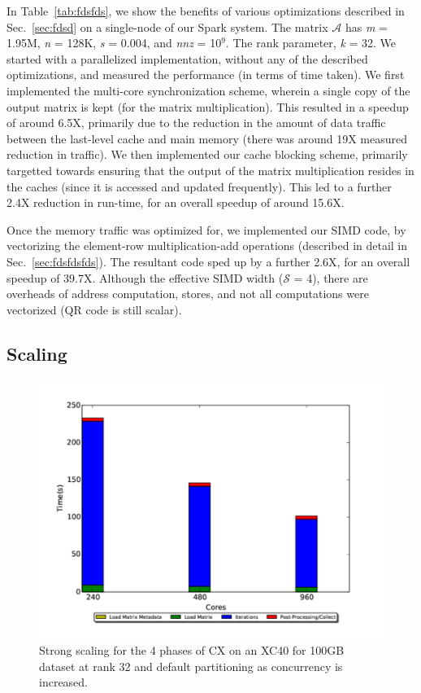   In Table~\ref{tab:fdsfds}, we show the benefits of various
  optimizations described in Sec.~\ref{sec:fdsd} on a single-node of our Spark system. 
  The matrix $\mathcal{A}$ has {\it{m}} = 1.95M, {\it{n}} = 128K,
  {\it{s}} = 0.004, and {\it{nnz}} = 10$^9$. The rank parameter,
  {\it{k}} = 32. We started with a parallelized implementation,
  without any of the described optimizations, and measured the 
  performance (in terms of time taken). We first implemented the 
  multi-core synchronization scheme, wherein a single copy of the 
  output matrix is kept (for the matrix multiplication).
  This resulted in a speedup of around 6.5X, primarily due to
  the reduction in the amount of data traffic between the 
  last-level cache and main memory (there was around 19X measured reduction
  in traffic). We then implemented our cache blocking scheme,
  primarily targetted towards ensuring that the output of the 
  matrix multiplication resides in the caches (since it is
  accessed and updated frequently). This led to a further 2.4X
 reduction in run-time, for an overall speedup of around 15.6X.

 Once the memory traffic was optimized for, we implemented our 
 SIMD code, by vectorizing the element-row multiplication-add
 operations (described in detail in Sec.~\ref{sec:fdsfdsfds}). 
 The resultant code sped up by a further 2.6X, for an overall
 speedup of 39.7X. Although the effective SIMD width
 ($\mathcal{S}$ = 4), there are overheads of address computation,
 stores, and not all computations were vectorized (QR code is still
 scalar).
 



  \subsection{Scaling}
    \begin{figure} [H]
    \begin{centering}
    \includegraphics[scale=0.4]{images/CX_Strong_Scaling_Rank_32_Partitions_default.pdf}
    \end{centering}
    \caption{ Strong scaling for the 4 phases of CX on an XC40 for 100GB dataset at rank 32 and default partitioning as concurrency is increased.} 
    \end{figure} 


